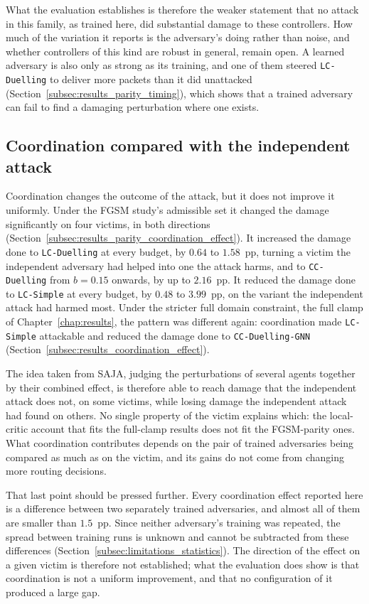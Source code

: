 What the evaluation establishes is therefore the weaker statement that no attack in this
family, as trained here, did substantial damage to these controllers. How much of the
variation it reports is the adversary's doing rather than noise, and whether controllers
of this kind are robust in general, remain open. A learned adversary is also only as
strong as its training, and one of them steered \texttt{LC-Duelling} to deliver more
packets than it did unattacked (Section~\ref{subsec:results_parity_timing}), which shows
that a trained adversary can fail to find a damaging perturbation where one exists.

\subsection{Coordination compared with the independent attack}
\label{subsec:conclusions_coordination}

Coordination changes the outcome of the attack, but it does not improve it uniformly.
Under the FGSM study's admissible set it changed the damage significantly on four
victims, in both directions (Section~\ref{subsec:results_parity_coordination_effect}).
It increased the damage done to \texttt{LC-Duelling} at every budget, by $0.64$ to
$1.58$~pp, turning a victim the independent adversary had helped into one the attack
harms, and to \texttt{CC-Duelling} from $b = 0.15$ onwards, by up to $2.16$~pp. It
reduced the damage done to \texttt{LC-Simple} at every budget, by $0.48$ to $3.99$~pp,
on the variant the independent attack had harmed most. Under the stricter full domain
constraint, the full clamp of Chapter~\ref{chap:results}, the
pattern was different again: coordination made \texttt{LC-Simple} attackable and
reduced the damage done to \texttt{CC-Duelling-GNN}
(Section~\ref{subsec:results_coordination_effect}).

The idea taken from SAJA, judging the perturbations of several agents together by
their combined effect, is therefore able to reach damage that the independent attack
does not, on some victims, while losing damage the independent attack had found on
others. No single property of the victim explains which: the local-critic account that
fits the full-clamp results does not fit the FGSM-parity ones. What coordination
contributes depends on the pair of trained adversaries being compared as much as on the
victim, and its gains do not come from changing more routing decisions.

That last point should be pressed further. Every coordination effect reported here is a
difference between two separately trained adversaries, and almost all of them are
smaller than $1.5$~pp. Since neither adversary's training was repeated, the spread
between training runs is unknown and cannot be subtracted from these differences
(Section~\ref{subsec:limitations_statistics}). The direction of the effect on a given
victim is therefore not established; what the evaluation does show is that coordination
is not a uniform improvement, and that no configuration of it produced a large gap.

